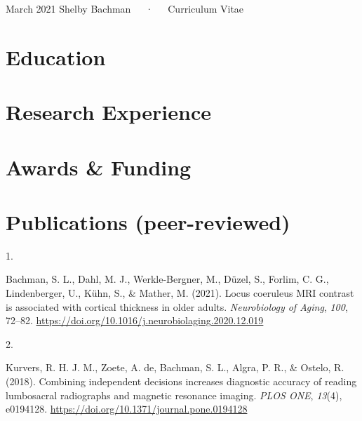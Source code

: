 \documentclass[11pt, a4paper]{awesome-cv}
\newlength{\csllabelwidth}
\newcommand{\CSLLeftMargin}[1]{\parbox[t]{\csllabelwidth}{#1}}
\newcommand{\CSLRightInline}[1]{\parbox[t]{\linewidth - \csllabelwidth}{#1}}
\begin{document}
\makecvheader

\makecvfooter
  {March 2021}
    {Shelby Bachman~~~·~~~Curriculum Vitae}
  {\thepage}





\hypertarget{education}{%
\section{Education}\label{education}}

\hypertarget{research-experience}{%
\section{Research Experience}\label{research-experience}}

\hypertarget{awards-funding}{%
\section{Awards \& Funding}\label{awards-funding}}

\hypertarget{publications-peer-reviewed}{%
\section{Publications
(peer-reviewed)}\label{publications-peer-reviewed}}

\hypertarget{bibliography}{}
\leavevmode\hypertarget{ref-bachman_locus_2021}{}%
\CSLLeftMargin{1. }
\CSLRightInline{Bachman, S. L., Dahl, M. J., Werkle-Bergner, M., Düzel,
S., Forlim, C. G., Lindenberger, U., Kühn, S., \& Mather, M. (2021).
Locus coeruleus MRI contrast is associated with cortical thickness in
older adults. \emph{Neurobiology of Aging}, \emph{100}, 72--82.
\url{https://doi.org/10.1016/j.neurobiolaging.2020.12.019}}

\leavevmode\hypertarget{ref-kurvers_combining_2018}{}%
\CSLLeftMargin{2. }
\CSLRightInline{Kurvers, R. H. J. M., Zoete, A. de, Bachman, S. L.,
Algra, P. R., \& Ostelo, R. (2018). Combining independent decisions
increases diagnostic accuracy of reading lumbosacral radiographs and
magnetic resonance imaging. \emph{PLOS ONE}, \emph{13}(4), e0194128.
\url{https://doi.org/10.1371/journal.pone.0194128}}
\end{document}
